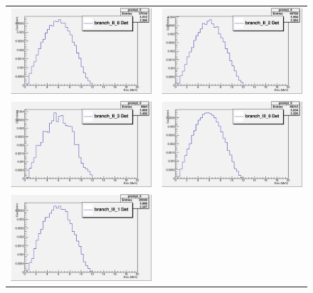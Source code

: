 \documentclass{JINST}
\begin{document}
\begin{figure}[htp]

  \centering

  

  \begin{tabular}{cc}


    \includegraphics[width=60mm]{MC_Li_10.eps}&

    \includegraphics[width=60mm]{MC_Li_12.eps}\\

    \includegraphics[width=60mm]{MC_Li_13.eps}&

    \includegraphics[width=60mm]{MC_Li_20.eps}\\

      \includegraphics[width=60mm]{MC_Li_21.eps}&


\end{tabular}
\end{figure}
\end{document}
